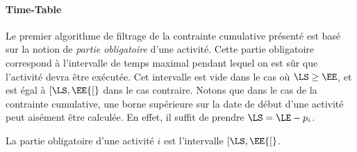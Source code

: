 \paragraph{Time-Table}
Le premier algorithme de filtrage de la contrainte cumulative
présenté est basé sur la notion de {\it partie obligatoire} d'une
activité. Cette partie obligatoire correspond à l'intervalle de temps
maximal pendant lequel on est sûr que l'activité devra être
exécutée. Cet intervalle est vide dans le cas où $\LS \ge \EE$, et est
égal à $[\LS,\EE{[}$ dans le cas contraire. Notons que dans le cas de la
contrainte cumulative, une borne supérieure sur la date de début d'une
activité peut aisément être calculée. En effet, il suffit de prendre
$\LS=\LE - p_i$. 


\begin{defi}
La partie obligatoire d'une activité $i$ est l'intervalle $[\LS,\EE{[}$.
\end{defi}

